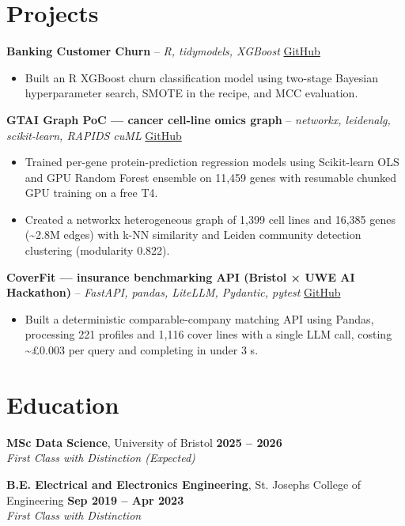 \documentclass[a4paper,11pt]{article}
\begin{document}
\section{Projects}
\noindent\textbf{Banking Customer Churn} -- \textit{R, tidymodels, XGBoost} \hfill \href{https://github.com/Thiruvel-AP/Banking-Customer-Churn-Prediction}{GitHub}
\begin{itemize}
  \item Built an R XGBoost churn classification model using two-stage Bayesian hyperparameter search, SMOTE in the recipe, and MCC evaluation.
\end{itemize}
\vspace{3pt}
\noindent\textbf{GTAI Graph PoC — cancer cell-line omics graph} -- \textit{networkx, leidenalg, scikit-learn, RAPIDS cuML} \hfill \href{https://github.com/Thiruvel-AP/GTAI-GraphPOC}{GitHub}
\begin{itemize}
  \item Trained per-gene protein-prediction regression models using Scikit-learn OLS and GPU Random Forest ensemble on 11,459 genes with resumable chunked GPU training on a free T4.
  \item Created a networkx heterogeneous graph of 1,399 cell lines and 16,385 genes (\textasciitilde{}2.8M edges) with k-NN similarity and Leiden community detection clustering (modularity 0.822).
\end{itemize}
\vspace{3pt}
\noindent\textbf{CoverFit — insurance benchmarking API (Bristol × UWE AI Hackathon)} -- \textit{FastAPI, pandas, LiteLLM, Pydantic, pytest} \hfill \href{https://github.com/Thiruvel-AP/AIHackathon-Phoenix}{GitHub}
\begin{itemize}
  \item Built a deterministic comparable-company matching API using Pandas, processing 221 profiles and 1,116 cover lines with a single LLM call, costing \textasciitilde{}£0.003 per query and completing in under 3 s.
\end{itemize}

\section{Education}
\textbf{MSc Data Science}, University of Bristol \hfill \textbf{2025 – 2026}\\ \textit{First Class with Distinction (Expected)}\par
\vspace{3pt}
\textbf{B.E. Electrical and Electronics Engineering}, St. Joseph\textquotesingle{}s College of Engineering \hfill \textbf{Sep 2019 – Apr 2023}\\ \textit{First Class with Distinction}\par
\end{document}
